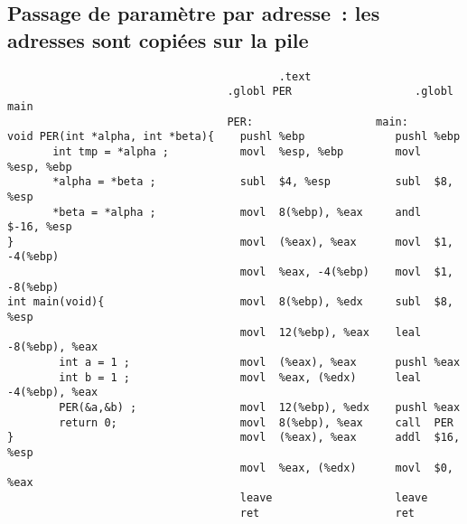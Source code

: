\begin{frame}
  \section{Passage de param\`etre par adresse~: les adresses sont copi\'ees sur la pile}%
\begin{verbatim}
                                          .text                   
                                  .globl PER                   .globl main                
                                  PER:                   main:                        
void PER(int *alpha, int *beta){    pushl %ebp              pushl %ebp                
       int tmp = *alpha ;           movl  %esp, %ebp        movl  %esp, %ebp        
       *alpha = *beta ;             subl  $4, %esp          subl  $8, %esp        
       *beta = *alpha ;             movl  8(%ebp), %eax     andl  $-16, %esp        
}                                   movl  (%eax), %eax      movl  $1, -4(%ebp)        
                                    movl  %eax, -4(%ebp)    movl  $1, -8(%ebp)        
int main(void){                     movl  8(%ebp), %edx     subl  $8, %esp        
                                    movl  12(%ebp), %eax    leal  -8(%ebp), %eax  
        int a = 1 ;                 movl  (%eax), %eax      pushl %eax                
        int b = 1 ;                 movl  %eax, (%edx)      leal  -4(%ebp), %eax  
        PER(&a,&b) ;                movl  12(%ebp), %edx    pushl %eax                
        return 0;                   movl  8(%ebp), %eax     call  PER                
}                                   movl  (%eax), %eax      addl  $16, %esp        
                                    movl  %eax, (%edx)      movl  $0, %eax        
                                    leave                   leave                              
                                    ret                     ret              
\end{verbatim}
\end{frame}
